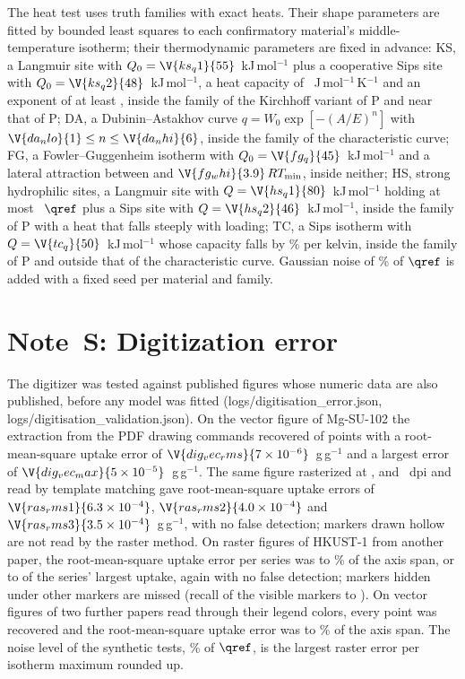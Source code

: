 \documentclass[11pt]{article}
\begin{document}
The heat test uses  truth families with exact heats. Their shape parameters are fitted by
bounded least squares to each confirmatory material's middle-temperature isotherm; their thermodynamic parameters
are fixed in advance:
KS, a Langmuir site with $Q_0 = \V{ks_q1}{55}$~kJ\,mol$^{-1}$ plus a cooperative Sips site with
$Q_0 = \V{ks_q2}{48}$~kJ\,mol$^{-1}$, a heat capacity of ~J\,mol$^{-1}$\,K$^{-1}$ and an exponent of at
least , inside the family of the Kirchhoff variant of P and near that of P;
DA, a Dubinin--Astakhov curve $q = W_0\exp[-(A/E)^{n}]$ with $\V{da_nlo}{1} \le n \le \V{da_nhi}{6}$, inside the
family of the characteristic curve;
FG, a Fowler--Guggenheim isotherm with $Q_0 = \V{fg_q}{45}$~kJ\,mol$^{-1}$ and a lateral attraction between
 and $\V{fg_whi}{3.9}\,RT_{\min}$, inside neither;
HS, strong hydrophilic sites, a Langmuir site with $Q = \V{hs_q1}{80}$~kJ\,mol$^{-1}$ holding at most
~$\qref$ plus a Sips site with $Q = \V{hs_q2}{46}$~kJ\,mol$^{-1}$, inside the family of P with a heat
that falls steeply with loading;
TC, a Sips isotherm with $Q = \V{tc_q}{50}$~kJ\,mol$^{-1}$ whose capacity falls by \% per kelvin,
inside the family of P and outside that of the characteristic curve.
Gaussian noise of \% of $\qref$ is added with a fixed seed per material and family.

\section*{Note~S: Digitization error}

The digitizer was tested against published figures whose numeric data are also published, before any model was
fitted (logs/digitisation\_error.json, logs/digitisation\_validation.json). On the vector figure of Mg-SU-102\cite{oppenheim2025} the
extraction from the PDF drawing commands recovered  of  points with a
root-mean-square uptake error of $\V{dig_vec_rms}{7\times10^{-6}}$~g\,g$^{-1}$ and a largest error of
$\V{dig_vec_max}{5\times10^{-5}}$~g\,g$^{-1}$. The same figure rasterized at ,  and
~dpi and read by template matching gave root-mean-square uptake errors of
$\V{ras_rms1}{6.3\times10^{-4}}$, $\V{ras_rms2}{4.0\times10^{-4}}$ and $\V{ras_rms3}{3.5\times10^{-4}}$~g\,g$^{-1}$,
with no false detection; markers drawn hollow are not read by the raster method. On raster figures of HKUST-1 from
another paper\cite{kang2024}, the root-mean-square uptake error per series was  to
\% of the axis span, or  to  of the series'
largest uptake, again with no false detection; markers hidden under other markers are missed (recall of the
visible markers  to ). On vector figures of two further papers\cite{liu2022emm8,gao2026} read
through their legend colors, every point was recovered and the root-mean-square uptake error was
 to \% of the axis span. The noise level of the synthetic tests,
\% of $\qref$, is the largest raster error per isotherm maximum rounded up.
\end{document}
